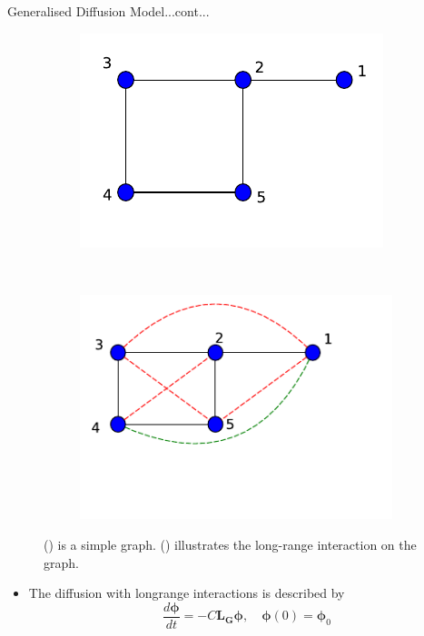 \documentclass{beamer}
\begin{document}
\begin{frame}{Generalised Diffusion Model...cont...}
	\begin{figure}[!h]
		\centering
		\begin{subfigure}[b]{0.3\textwidth}
			\includegraphics[width=\textwidth]{images/kenel-toymodel.pdf}
			\caption{}
			\label{toymodel}
		\end{subfigure}~
		\begin{subfigure}[b]{0.3\textwidth}
			\includegraphics[width= \textwidth]{images/graph-longrange-demo.pdf}
			\caption{}
			\label{graph-longrange}
		\end{subfigure}
		\caption{() is a simple graph. () illustrates the long-range interaction on the graph.   }
		\label{}
	\end{figure}
\begin{itemize}
	\item The diffusion with longrange interactions is described by
	\begin{equation}
	\frac{d\boldsymbol{\phi}}{dt} =  -C\mathbf{L_G}\boldsymbol{\phi},  \quad \boldsymbol{\phi}(0) = \boldsymbol{\phi}_0 
	\end{equation}
\end{itemize}
\end{frame}
\end{document}
